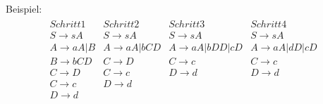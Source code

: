 \documentclass{article}
\begin{document}
Beispiel:
\begin{align*}
\begin{array}{llll}
Schritt 1 & Schritt 2 & Schritt 3 & Schritt 4 \\
\hline
S \rightarrow sA     & S \rightarrow sA       & S \rightarrow sA            & S \rightarrow sA \\
A \rightarrow aA | B & A \rightarrow aA | bCD & A \rightarrow aA | bDD | cD & A \rightarrow aA | dD | cD \\
B \rightarrow bCD    & C \rightarrow D        & C \rightarrow c             & C \rightarrow c \\
C \rightarrow D      & C \rightarrow c        & D \rightarrow d             & D \rightarrow d \\
C \rightarrow c      & D \rightarrow d        &                             & \\
D \rightarrow d      &                        &                             & \\
\end{array}
\end{align*}
\end{document}
